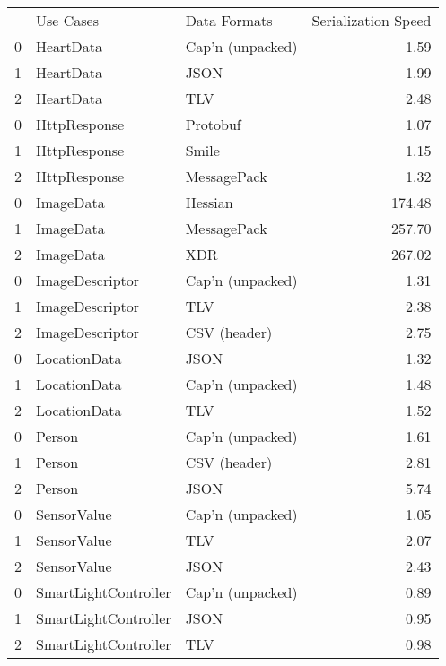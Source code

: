 \begin{tabular}{lllr}
 & Use Cases & Data Formats & Serialization Speed \\
0 & HeartData & Cap'n (unpacked) & 1.59 \\
1 & HeartData & JSON & 1.99 \\
2 & HeartData & TLV & 2.48 \\
0 & HttpResponse & Protobuf & 1.07 \\
1 & HttpResponse & Smile & 1.15 \\
2 & HttpResponse & MessagePack & 1.32 \\
0 & ImageData & Hessian & 174.48 \\
1 & ImageData & MessagePack & 257.70 \\
2 & ImageData & XDR & 267.02 \\
0 & ImageDescriptor & Cap'n (unpacked) & 1.31 \\
1 & ImageDescriptor & TLV & 2.38 \\
2 & ImageDescriptor & CSV (header) & 2.75 \\
0 & LocationData & JSON & 1.32 \\
1 & LocationData & Cap'n (unpacked) & 1.48 \\
2 & LocationData & TLV & 1.52 \\
0 & Person & Cap'n (unpacked) & 1.61 \\
1 & Person & CSV (header) & 2.81 \\
2 & Person & JSON & 5.74 \\
0 & SensorValue & Cap'n (unpacked) & 1.05 \\
1 & SensorValue & TLV & 2.07 \\
2 & SensorValue & JSON & 2.43 \\
0 & SmartLightController & Cap'n (unpacked) & 0.89 \\
1 & SmartLightController & JSON & 0.95 \\
2 & SmartLightController & TLV & 0.98 \\
\end{tabular}
